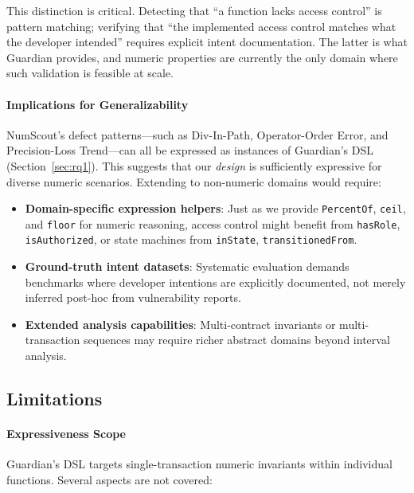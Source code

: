 \documentclass[pdflatex,sn-basic]{sn-jnl}%
\theoremstyle{thmstyleone}%
\theoremstyle{thmstyletwo}%
\theoremstyle{thmstylethree}%
\begin{document}
This distinction is critical. Detecting that ``a function lacks access control'' is pattern matching; verifying that ``the implemented access control matches what the developer intended'' requires explicit intent documentation. The latter is what Guardian provides, and numeric properties are currently the only domain where such validation is feasible at scale.

\paragraph{Implications for Generalizability}
NumScout's defect patterns—such as Div-In-Path, Operator-Order Error, and Precision-Loss Trend—can all be expressed as instances of Guardian's DSL (Section~\ref{sec:rq1}). This suggests that our \textit{design} is sufficiently expressive for diverse numeric scenarios. Extending to non-numeric domains would require:
\begin{itemize}
    \item \textbf{Domain-specific expression helpers}: Just as we provide \texttt{PercentOf}, \texttt{ceil}, and \texttt{floor} for numeric reasoning, access control might benefit from \texttt{hasRole}, \texttt{isAuthorized}, or state machines from \texttt{inState}, \texttt{transitionedFrom}.
    \item \textbf{Ground-truth intent datasets}: Systematic evaluation demands benchmarks where developer intentions are explicitly documented, not merely inferred post-hoc from vulnerability reports.
    \item \textbf{Extended analysis capabilities}: Multi-contract invariants or multi-transaction sequences may require richer abstract domains beyond interval analysis.
\end{itemize}

\subsection{Limitations}

\paragraph{Expressiveness Scope}
Guardian's DSL targets single-transaction numeric invariants within individual functions. Several aspects are not covered:
\end{document}
